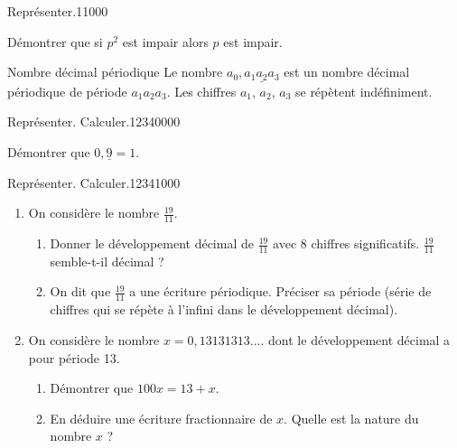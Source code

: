\begin{pageParcourst} %

\begin{ExoCtN}{Représenter.}{1}{1}{0}{0}{0}

Démontrer que si $p^2$ est impair alors $p$ est impair.

 
\end{ExoCtN}

\begin{DefT}{Nombre décimal périodique}
Le nombre $a_0,\underline{a_1a_2a_3}$ est un nombre décimal périodique de période $a_1a_2a_3$. Les chiffres $a_1$, $a_2$, $a_3$ se répètent indéfiniment.
\end{DefT}

\begin{ExoCtN}{Représenter. Calculer.}{1234}{0}{0}{0}{0} 
 
Démontrer que $0,\underline{9}=1$.   
 
\end{ExoCtN}

\begin{ExoCtN}{Représenter. Calculer.}{1234}{1}{0}{0}{0}

\begin{enumerate}
\item On considère le nombre $\frac{19}{11}$.

\begin{enumerate}
\item Donner le développement décimal de $\frac{19}{11}$ avec 8 chiffres significatifs. $\frac{19}{11}$ semble-t-il décimal ?
\item On dit que $\frac{19}{11}$ a une écriture périodique.
Préciser sa période (série de chiffres qui se répète à l'infini dans le développement décimal).
\end{enumerate}
\item On considère le nombre $x=0,13131313....$ dont le développement décimal a pour période 13.
\begin{enumerate}
\item Démontrer que $100x = 13 + x$. 
\item  En déduire une écriture fractionnaire de $x$. Quelle est la nature du nombre $x$ ?
\end{enumerate}
\end{enumerate} 
 
\end{ExoCtN}


\end{pageParcourst}
